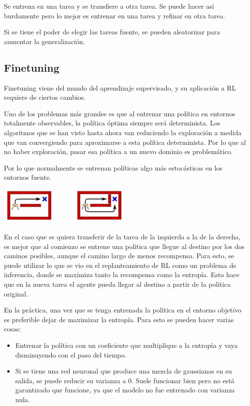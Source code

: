 Se entrena en una tarea y se transfiere a otra tarea. Se puede hacer así burdamente pero lo
mejor es entrenar en una tarea y refinar en otra tarea.

Si se tiene el poder de elegir las tareas fuente, se pueden aleatorizar para aumentar la
generalización.

\subsection{Finetuning}%
\label{sub:finetuning}

Finetuning viene del mundo del aprendizaje supervisado, y su aplicación a RL requiere de ciertos
cambios.

Uno de los problemas más grandes es que al entrenar una política en entornos totalmente
observables, la política óptima siempre será determinista. Los algoritmos que se han visto
hasta ahora van reduciendo la exploración a medida que van convergiendo para aproximarse a esta
política determinista. Por lo que al no haber exploración, pasar esa política a un nuevo
dominio es problemático.

Por lo que normalmente se entrenan políticas algo más estocásticas en los entornos fuente.

\begin{center}
\includegraphics[width=0.5\textwidth]{figures/2020-07-08-151636_672x188_scrot.png}
\end{center}

En el caso que se quiera transferir de la tarea de la izquierda a la de la derecha, es mejor
que al comienzo se entrene una política que llegue al destino por los dos caminos posibles,
aunque el camino largo de menos recompensa. Para esto, se puede utilizar lo que se vio en el
replanteamiento de RL como un problema de inferencia, donde se maximiza tanto la recompensa
como la entropía. Esto hace que en la nueva tarea el agente pueda llegar al destino a partir de
la política original.

En la práctica, una vez que se tenga entrenada la política en el entorno objetivo es
preferible dejar de maximizar la entropía. Para esto se pueden hacer varias cosas:
\begin{itemize}
    \item Entrenar la política con un coeficiente que multiplique a la entropía y vaya
        disminuyendo con el paso del tiempo.
    \item Si se tiene una red neuronal que produce una mezcla de gaussianas en su salida, se
        puede reducir su varianza a 0. Suele funcionar bien pero no está garantizado que
        funcione, ya que el modelo no fue entrenado con varianza nula.
\end{itemize}

